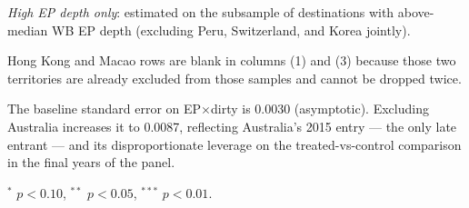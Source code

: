 \begin{table}[htbp]
\begin{threeparttable}
\begin{tablenotes}[flushleft]
\item \textit{High EP depth only}: estimated on the subsample of destinations with above-median WB EP depth (excluding Peru, Switzerland, and Korea jointly).
\item Hong Kong and Macao rows are blank in columns (1) and (3) because those two territories are already excluded from those samples and cannot be dropped twice.
\item The baseline standard error on EP$\times$dirty is 0.0030 (asymptotic). Excluding Australia increases it to 0.0087, reflecting Australia's 2015 entry --- the only late entrant --- and its disproportionate leverage on the treated-vs-control comparison in the final years of the panel.
\item $^{*}$ $p<0.10$, $^{**}$ $p<0.05$, $^{***}$ $p<0.01$.
\end{tablenotes}
\end{threeparttable}
\end{table}

